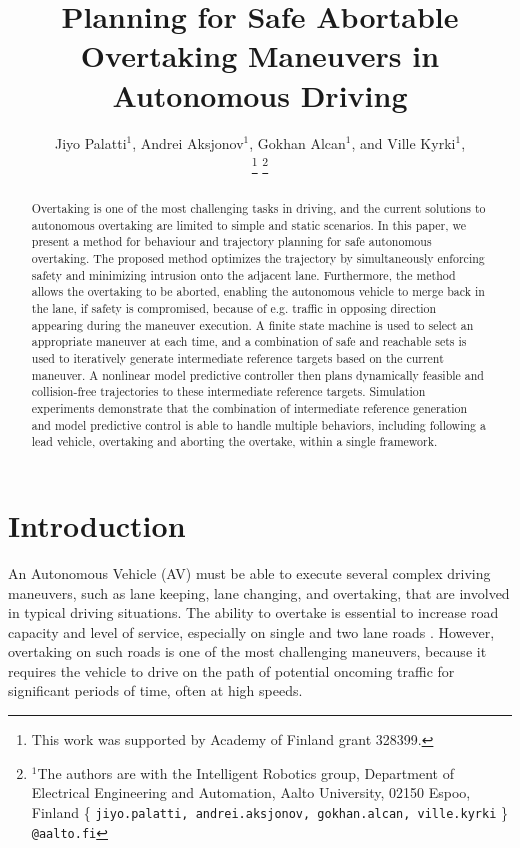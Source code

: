 \documentclass[letterpaper, 10 pt, conference]{ieeeconf}
\title{\LARGE \bf
Planning for Safe Abortable Overtaking Maneuvers in \linebreak Autonomous Driving  
}
\author{Jiyo Palatti$^{1}$, Andrei Aksjonov$^{1}$, Gokhan Alcan$^{1}$, and Ville Kyrki$^{1}$, \IEEEmembership{Senior Member, IEEE}%

\thanks{This work was supported by Academy of Finland grant 328399.}%
\thanks{$^{1}$The authors are with the Intelligent Robotics group, Department of Electrical Engineering and Automation, Aalto University, 02150 Espoo, Finland \{ {\tt\small jiyo.palatti, andrei.aksjonov, gokhan.alcan, ville.kyrki} \} {\tt\small @aalto.fi}
}}
\begin{document}
\maketitle
\thispagestyle{empty}
\pagestyle{empty}

\begin{abstract}
Overtaking is one of the most challenging tasks in driving, and the current solutions to autonomous overtaking are limited to simple and static scenarios. 
In this paper, we present a method for behaviour and trajectory planning for safe autonomous overtaking. 
The proposed method optimizes the trajectory by simultaneously enforcing safety and minimizing intrusion onto the adjacent lane. Furthermore, the method allows the overtaking to be aborted, enabling the autonomous vehicle to merge back in the lane, if safety is compromised, because of e.g. traffic in opposing direction appearing during the maneuver execution. A finite state machine is used to select an appropriate maneuver at each time, and a combination of safe and reachable sets is used to iteratively generate intermediate reference targets based on the current maneuver. A nonlinear model predictive controller then plans dynamically feasible and collision-free trajectories to these intermediate reference targets.
Simulation experiments demonstrate that the combination of intermediate reference generation and model predictive control is able to handle multiple behaviors, including following a lead vehicle, overtaking and aborting the overtake, within a single framework. 
\end{abstract}

\section{Introduction}
An Autonomous Vehicle (AV) must be able to execute several complex driving maneuvers, such as lane keeping, lane changing, and overtaking, that are involved in typical driving situations. 
The ability to overtake is essential to increase road capacity and level of service, especially on single and two lane roads \cite{farahWhenDriversAbort2016}.
However, overtaking on such roads is one of the most challenging maneuvers, because it requires the vehicle to drive on the path of potential oncoming traffic for significant periods of time, often at high speeds.  
\end{document}
